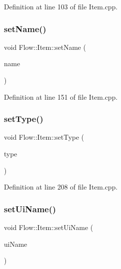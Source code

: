 Definition at line 103 of file Item.\+cpp.

\hypertarget{class_flow_1_1_item_a0702f86543974cfe3d8f54e6a4eb04d8}{}\label{class_flow_1_1_item_a0702f86543974cfe3d8f54e6a4eb04d8} 
\subsubsection{\texorpdfstring{set\+Name()}{setName()}}
{\footnotesize\ttfamily void Flow\+::\+Item\+::set\+Name (\begin{DoxyParamCaption}\item[{std\+::string}]{name }\end{DoxyParamCaption})}



Definition at line 151 of file Item.\+cpp.

\hypertarget{class_flow_1_1_item_a1aaf604e126a99c3576b185d62e5a5dc}{}\label{class_flow_1_1_item_a1aaf604e126a99c3576b185d62e5a5dc} 
\subsubsection{\texorpdfstring{set\+Type()}{setType()}}
{\footnotesize\ttfamily void Flow\+::\+Item\+::set\+Type (\begin{DoxyParamCaption}\item[{\hyperlink{namespace_flow_ab521722c5aec75faa5be9c5ccfff33d6}{Itm\+Type}}]{type }\end{DoxyParamCaption})}



Definition at line 208 of file Item.\+cpp.

\hypertarget{class_flow_1_1_item_a64e2ab7077dd3f97ee94c610fbd5ee8f}{}\label{class_flow_1_1_item_a64e2ab7077dd3f97ee94c610fbd5ee8f} 
\subsubsection{\texorpdfstring{set\+Ui\+Name()}{setUiName()}}
{\footnotesize\ttfamily void Flow\+::\+Item\+::set\+Ui\+Name (\begin{DoxyParamCaption}\item[{std\+::string}]{ui\+Name }\end{DoxyParamCaption})}



